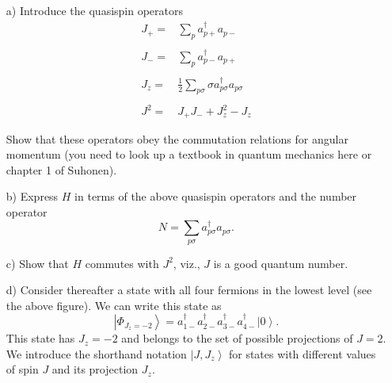 \documentclass[11pt,a4wide]{article}
\newcommand{\ket}[1]{\left| #1 \right\rangle}
\begin{document}
\begin{enumerate}
\item[a)] Introduce the quasispin operators
\[
\begin{array}{ll}
J_{+}=&\sum_{p}
a_{p+}^{\dagger}a_{p-}\\
&\\
J_{-}=&\sum_{p}
a_{p-}^{\dagger}a_{p+}\\
&\\
J_{z}=&\frac{1}{2}\sum_{p\sigma}\sigma
a_{p\sigma}^{\dagger}a_{p\sigma}\\
&\\
J^{2}=&J_{+}J_{-}+J_{z}^{2}-J_{z}\\
&\\
\end{array}
\]
Show that these operators obey the commutation relations for angular momentum (you need to look up a textbook in quantum mechanics here or chapter 1 of Suhonen).\newline
\item[b)] Express $H$ in terms of the above quasispin operators and the number operator
\[
N=\sum_{p\sigma}
a_{p\sigma}^{\dagger}a_{p\sigma}.
\]
\item[c)] Show that $H$ commutes with $J^{2}$, viz., $J$ is a good quantum number.\newline
\item[d)] Consider thereafter a state with all four fermions in the lowest level (see the above figure).
We can write this state as
\[
\ket{\Phi_{J_z=-2}} =a_{1-}^{\dagger}a_{2-}^{\dagger}
a_{3-}^{\dagger}a_{4-}^{\dagger}\ket{0}.
\]
This state has $J_{z}=-2$ and belongs to the set of possible projections of 
$J=2$. We introduce the shorthand notation
$\ket{J,J_z}$ for states with different values of
spin $J$ and its projection $J_z$.


\end{enumerate}
\end{document}
